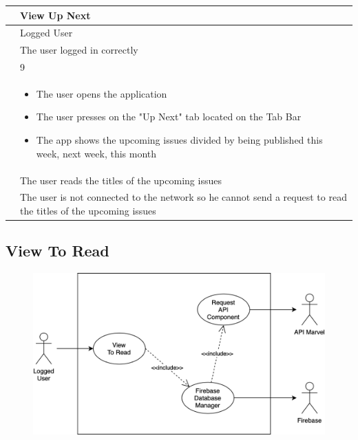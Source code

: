 {{\renewcommand{\arraystretch}{2}
{\begin{center}
\begin{tabular}{ | m{4cm} | m{9cm} | } 
 \hline
 {\centering{\textbf{Name}}} & View Up Next \\
 \hline
 {\centering{\textbf{Actor}}} & Logged User \\
 \hline
 {\centering{\textbf{Entry Condition}}} & The user logged in correctly \\
 \hline
 {\centering{\textbf{Goal}}} & 9 \\
 \hline
 {\centering{\textbf{Event flow}}} & \begin{itemize}[leftmargin=*]
 	\item The user opens the application
	\item The user presses on the "Up Next" tab located on the Tab Bar
	\item The app shows the upcoming issues divided by being published this week, next week, this month
	\end{itemize} \\	
 \hline
 {\centering{\textbf{Exit condition}}} & The user reads the titles of the upcoming issues \\
 \hline
 {\centering{\textbf{Exceptions}}} & The user is not connected to the network so he cannot send a request to read the titles of the upcoming issues \\
 \hline
\end{tabular}
\end{center}}

\clearpage

\subsection{View To Read}
\begin{figure}[h]
\centering
\includegraphics[width=\textwidth]{img/usecases/viewtoread}
\end{figure}

}}
